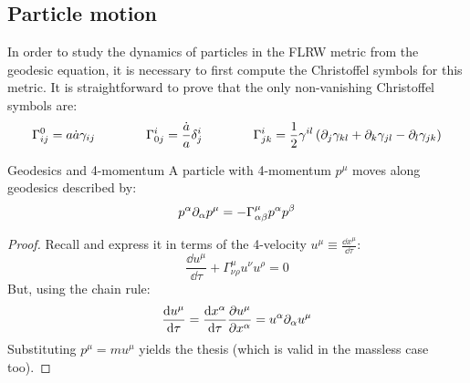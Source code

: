 \subsection{Particle motion}

In order to study the dynamics of particles in the FLRW metric from the geodesic equation, it is necessary to first compute the Christoffel symbols for this metric. It is straightforward to prove that the only non-vanishing Christoffel symbols are:
\begin{equation}
  \Gamma^0_{ij} = a\dot{a} \gamma_{ij}
  \qquad \qquad
  \Gamma^i_{0j} = \frac{\dot{a}}{a} \delta^i_j
  \qquad \qquad
  \Gamma^i_{jk} = \frac{1}{2} \gamma^{il} \left( \partial_j \gamma_{kl} + \partial_k \gamma_{jl} - \partial_l \gamma_{jk} \right)
  \label{eq:flrw-christoffel}
\end{equation}

\begin{proposition}{Geodesics and 4-momentum}{}
  A particle with 4-momentum $ p^\mu $ moves along geodesics described by:
  \begin{equation}
    p^\alpha \partial_\alpha p^\mu = - \Gamma^\mu_{\alpha \beta} p^\alpha p^\beta
  \end{equation}
\end{proposition}

\begin{proofbox}
  \begin{proof}
    Recall  and express it in terms of the 4-velocity $ u^\mu \equiv \frac{\dd x^\mu}{\dd \tau} $:
    \begin{equation*}
      \frac{\dd u^\mu}{\dd \tau} + \Gamma^\mu_{\nu \rho} u^\nu u^\rho = 0
    \end{equation*}
    But, using the chain rule:
    \begin{equation*}
      \frac{\mathrm{d} u^\mu}{\mathrm{d} \tau} = \frac{\mathrm{d} x^\alpha}{\mathrm{d} \tau} \frac{\partial u^\mu}{\partial x^\alpha} = u^\alpha \partial_\alpha u^\mu
    \end{equation*}
    Substituting $ p^\mu = m u^\mu $ yields the thesis (which is valid in the massless case too).
  \end{proof}
\end{proofbox}

